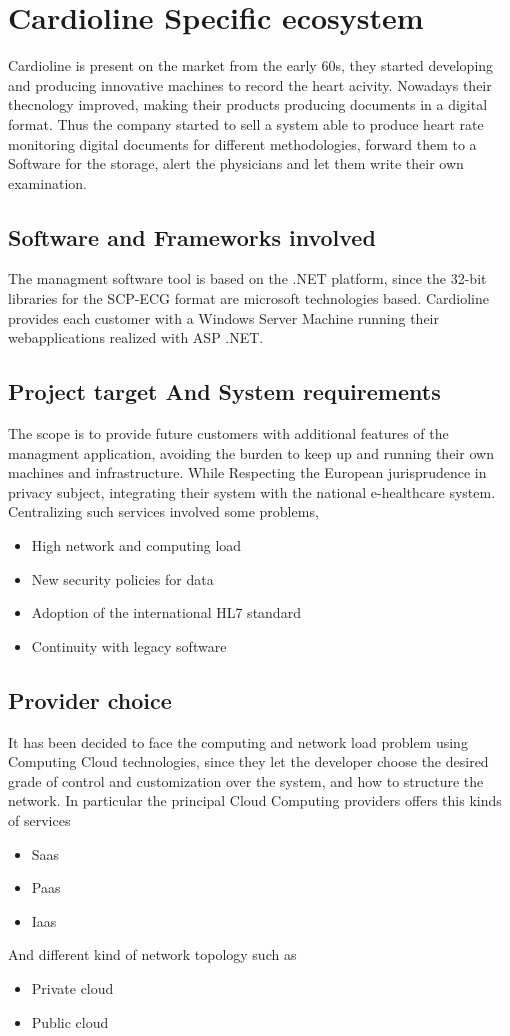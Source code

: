 \chapter{Cardioline Specific ecosystem}
Cardioline is present on the market from the early 60s, they started developing and producing innovative machines to record the heart acivity. Nowadays their thecnology improved, making their products producing documents in a digital format.
Thus the company started to sell a system able to produce heart rate monitoring digital documents for different methodologies, forward them to a Software for the storage, alert the physicians and let them write their own examination.
\section{Software and Frameworks involved}
The managment software tool is based on the .NET platform, since the 32-bit libraries for the SCP-ECG format are microsoft technologies based.
Cardioline provides each customer with a Windows Server Machine running their webapplications realized with ASP .NET.
\section{Project target And System requirements}
The scope is to provide future customers with additional features of the managment application, avoiding the burden to keep up and running their own machines and infrastructure.
While Respecting the European jurisprudence in privacy subject, integrating their system with the national e-healthcare system.
Centralizing such services involved some problems,
\begin{itemize}
    \item High network and computing load
    \item New security policies for data
    \item Adoption of the international HL7 standard
    \item Continuity with legacy software
\end{itemize}
\section{Provider choice}
It has been decided to face the computing and network load problem using Computing Cloud technologies, since they let the developer choose the desired grade of control and customization over the system, and how to structure the network.
In particular the principal Cloud Computing providers offers this kinds of services
\begin{itemize}
    \item Saas
    \item Paas
    \item Iaas
\end{itemize}
And different kind of network topology such as
\begin{itemize}
    \item Private cloud
    \item Public cloud
\end{itemize}

